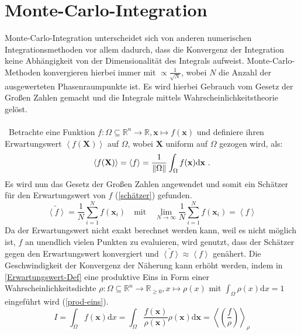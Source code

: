 \section{Monte-Carlo-Integration}
Monte-Carlo-Integration unterscheidet sich von anderen numerischen Integrationsmethoden vor allem dadurch, dass die Konvergenz der Integration keine Abhängigkeit von der Dimensionalität des Integrals aufweist. Monte-Carlo-Methoden konvergieren hierbei immer mit $\propto \frac{1}{\sqrt{N}} $, wobei $N$ die Anzahl der ausgewerteten Phasenraumpunkte ist. Es wird hierbei Gebrauch vom Gesetz der Großen Zahlen gemacht und die Integrale mittels Wahrscheinlichkeitstheorie gelöst. \\
\\\
Betrachte eine Funktion $f: \Omega \subseteq \mathbb{R}^n \rightarrow \mathbb{R}, \mathbf{x} \mapsto f(\mathbf{x})$ und definiere ihren Erwartungswert $\left\langle f(\mathbf{X})\right\rangle $ auf $\Omega$, wobei $\mathbf{X}$ uniform auf $\Omega$ gezogen wird, als:
\begin{equation}
\left\langle f(\mathbf{X})\right\rangle  = \left\langle f\right\rangle  = \frac{1}{\norm{\Omega}}\int_{\Omega} f(\mathbf{x}) \text{d}\mathbf{x}~.
\label{Erwartungswert-Def} 
\end{equation}
Es wird nun das Gesetz der Großen Zahlen angewendet und somit ein Schätzer für den Erwartungswert von $f$ (\textsf{\autoref{schätzer}}) gefunden.
\begin{equation}
\tilde{\left\langle f \right\rangle } = \frac{1}{N} \sum_{i=1}^{N} f(\mathbf{x}_i) \quad \text{mit} \quad \lim_{N\rightarrow \infty} \frac{1}{N} \sum_{i=1}^{N} f(\mathbf{x}_i) = \left\langle f \right\rangle
\label{schätzer}
\end{equation}
Da der Erwartungswert nicht exakt berechnet werden kann, weil es nicht möglich ist, $f$ an unendlich vielen Punkten zu evaluieren, wird genutzt, dass der Schätzer gegen den Erwartungswert konvergiert und $\tilde{\left\langle f \right\rangle } \approx \left\langle f \right\rangle$ genähert. Die Geschwindigkeit der Konvergenz der Näherung kann erhöht werden, indem in \textsf{\autoref{Erwartungswert-Def}} eine produktive Eins in Form einer Wahrscheinlichkeitsdichte $\rho: \Omega \subseteq \mathbb{R}^n \to \mathbb{R}_{\geq 0}, x \mapsto \rho(x)$ mit $\int_{\Omega} \rho(x) \text{d}x = 1$ eingeführt wird (\textsf{\autoref{prod-eins}}).
\begin{equation}
I = \int_{\Omega} f(\mathbf{x}) \text{d}x =  \int_{\Omega} \frac{f(\mathbf{x})}{\rho(\mathbf{x})}\rho(\mathbf{x}) \text{d}\mathbf{x} = \left\langle \left(\frac{f}{\rho}\right) \right\rangle_{\rho}
\label{prod-eins} 
\end{equation}
